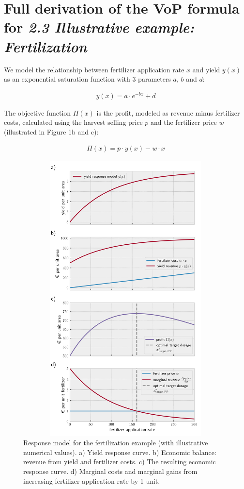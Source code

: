 \hypertarget{full-derivation-of-the-vop-formula-for-23-illustrative-example-fertilization}{%
\section*{\texorpdfstring{Full derivation of the VoP formula for \emph{2.3 Illustrative example: Fertilization}}{Full derivation of the VoP formula for 2.3 Illustrative example: Fertilization}}\label{full-derivation-of-the-vop-formula-for-23-illustrative-example-fertilization}}

We model the relationship between fertilizer application rate $x$ and yield $y(x)$ as an exponential saturation function with 3 parameters $a$, $b$ and $d$:

\begin{align}
y(x) = a \cdot e^{-b x} + d
\end{align}

The objective function $\Pi(x)$ is the profit, modeled as revenue minus fertilizer costs, calculated using the harvest selling price $p$ and the fertilizer price $w$ (illustrated in Figure 1b and c):

\begin{align}
\Pi(x) = p\cdot y(x) - w\cdot x
\end{align}

\begin{figure}
\centering
\includegraphics[width=15cm,height=15cm,keepaspectratio]{imgs/synplot1.png}
\caption{Response model for the fertilization example (with illustrative numerical values). a) Yield response curve. b) Economic balance: revenue from yield and fertilizer costs. c) The resulting economic response curve. d) Marginal costs and marginal gains from increasing fertilizer application rate by 1 unit.}
\end{figure}

